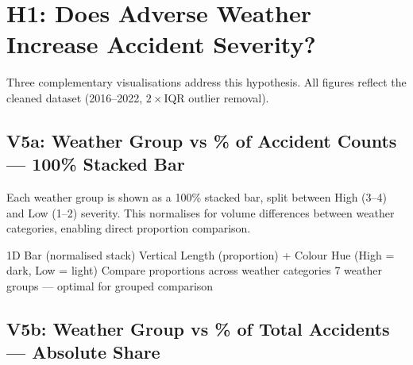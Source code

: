 
\section{H1: Does Adverse Weather Increase Accident Severity?}

Three complementary visualisations address this hypothesis. All figures reflect
the cleaned dataset (2016--2022, $2\times$IQR outlier removal).

\subsection{V5a: Weather Group vs \% of Accident Counts --- 100\% Stacked Bar}

Each weather group is shown as a 100\% stacked bar, split between High (3--4)
and Low (1--2) severity. This normalises for volume differences between weather
categories, enabling direct proportion comparison.

\begin{figure}[H]
  \centering
  \label{fig:v5a}
\end{figure}

\idiomtable
  {1D Bar (normalised stack)}
  {Vertical Length (proportion) + Colour Hue (High = dark, Low = light)}
  {Compare proportions across weather categories}
  {7 weather groups --- optimal for grouped comparison}


\subsection{V5b: Weather Group vs \% of Total Accidents --- Absolute Share}

